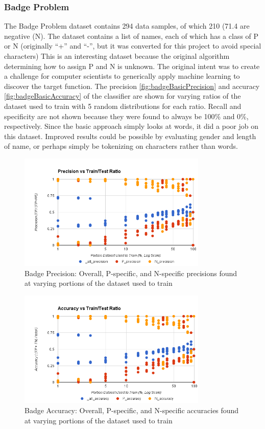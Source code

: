 \subsubsection{Badge Problem}
\label{subsection:badgesBasic}
The Badge Problem dataset \cite{badge} contains 294 data samples, of which 210 (71.4%
are negative (N). The dataset contains a list of names, each of which has a class of P or N (originally ``+'' and ``-'',
but it was converted for this project to avoid special characters) This is an interesting dataset because the original
algorithm determining how to assign P and N is unknown. The original intent was to create a challenge for computer
scientists to generically apply machine learning to discover the target function. The precision
\ref{fig:badgeBasicPrecision} and accuracy \ref{fig:badgeBasicAccuracy} of the classifier are shown for varying ratios
of the dataset used to train with 5 random distributions for each ratio. Recall and specificity are not shown because
they were found to always be 100\% and 0\%, respectively. Since the basic approach simply looks at words, it did a
poor job on this dataset. Improved results could be possible by evaluating gender and length of name, or perhaps
simply be tokenizing on characters rather than words.

\begin{figure}[ht!]
    \centering
    \includegraphics[width=90mm]{img/badge_basic-precision.png}
    \caption{Badge Precision: Overall, P-specific, and N-specific precisions found at varying portions of the dataset used to train}
    \label{fig:spamBasicPrecision}
\end{figure}

\begin{figure}[ht!]
    \centering
    \includegraphics[width=90mm]{img/badge_basic-accuracy.png}
    \caption{Badge Accuracy: Overall, P-specific, and N-specific accuracies found at varying portions of the dataset used to train}
    \label{fig:smsBasicAccuracy}
\end{figure}

